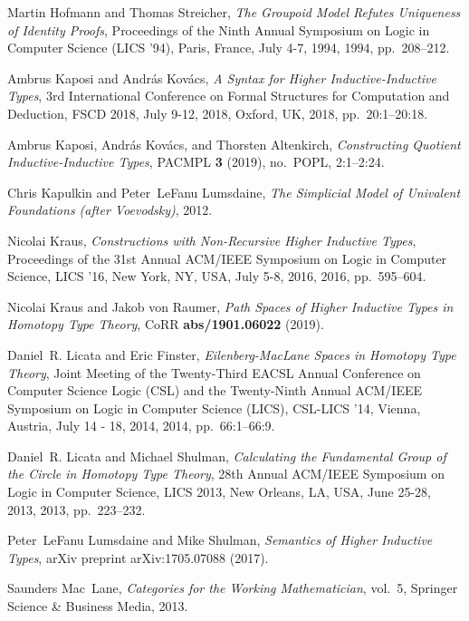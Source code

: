 \documentclass[9pt]{entcs}
\newcommand{\0}{\textbf{0}} %
\newcommand{\1}{\textbf{1}} %
\begin{document}
\begin{thebibliography}{10}
	Martin Hofmann and Thomas Streicher, \emph{{The Groupoid Model Refutes
			Uniqueness of Identity Proofs}}, Proceedings of the Ninth Annual Symposium on
	Logic in Computer Science {(LICS} '94), Paris, France, July 4-7, 1994, 1994,
	pp.~208--212.
	
	Ambrus Kaposi and Andr{\'{a}}s Kov{\'{a}}cs, \emph{{A Syntax for Higher
			Inductive-Inductive Types}}, 3rd International Conference on Formal
	Structures for Computation and Deduction, {FSCD} 2018, July 9-12, 2018,
	Oxford, {UK}, 2018, pp.~20:1--20:18.
	
	Ambrus Kaposi, Andr{\'{a}}s Kov{\'{a}}cs, and Thorsten Altenkirch,
	\emph{{Constructing Quotient Inductive-Inductive Types}}, {PACMPL} \textbf{3}
	(2019), no.~{POPL}, 2:1--2:24.
	
	Chris Kapulkin and Peter~LeFanu Lumsdaine, \emph{{The Simplicial Model of
			Univalent Foundations (after Voevodsky)}}, 2012.
	
	Nicolai Kraus, \emph{{Constructions with Non-Recursive Higher Inductive
			Types}}, Proceedings of the 31st Annual {ACM/IEEE} Symposium on Logic in
	Computer Science, {LICS} '16, New York, NY, USA, July 5-8, 2016, 2016,
	pp.~595--604.
	
	Nicolai Kraus and Jakob von Raumer, \emph{{Path Spaces of Higher Inductive
			Types in Homotopy Type Theory}}, CoRR \textbf{abs/1901.06022} (2019).
	
	Daniel~R. Licata and Eric Finster, \emph{{Eilenberg-MacLane Spaces in Homotopy
			Type Theory}}, Joint Meeting of the Twenty-Third {EACSL} Annual Conference on
	Computer Science Logic {(CSL)} and the Twenty-Ninth Annual {ACM/IEEE}
	Symposium on Logic in Computer Science (LICS), {CSL-LICS} '14, Vienna,
	Austria, July 14 - 18, 2014, 2014, pp.~66:1--66:9.
	
	Daniel~R. Licata and Michael Shulman, \emph{{Calculating the Fundamental Group
			of the Circle in Homotopy Type Theory}}, 28th Annual {ACM/IEEE} Symposium on
	Logic in Computer Science, {LICS} 2013, New Orleans, LA, USA, June 25-28,
	2013, 2013, pp.~223--232.
	
	Peter~LeFanu Lumsdaine and Mike Shulman, \emph{{Semantics of Higher Inductive
			Types}}, arXiv preprint arXiv:1705.07088 (2017).
	
	Saunders Mac~Lane, \emph{{Categories for the Working Mathematician}}, vol.~5,
	Springer Science \& Business Media, 2013.
	

\end{thebibliography}
\end{document}
